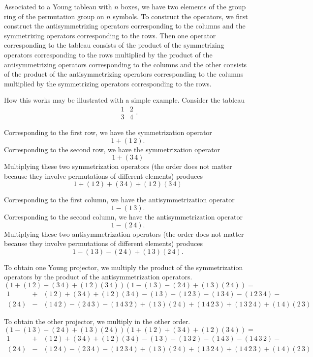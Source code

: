 \documentclass[12pt]{article}
\begin{document}
Associated to a Young tableau with $n$ boxes, we have two elements 
of the group ring of the permutation group on $n$ symbols.  To
construct the operators, we first construct the antisymmetrizing
operators corresponding to the columns and the symmetrizing
operators corresponding to the rows.  Then one operator corresponding
to the tableau consists of the product of the symmetrizing operators
corresponding to the rows multiplied by the product of the 
antisymmetrizing operators corresponding to the columns and the
other consists of the product of the antisymmetrizing operators 
corresponding to the columns multiplied by the symmetrizing operators
corresponding to the rows.

How this works may be illustrated with a simple example.  Consider
the tableau
\[
\begin{matrix}
1 & 2\\
3 & 4
\end{matrix}.
\]

Corresponding to the first row, we have the symmetrization operator
\[
1 + (1\,2).
\]
Corresponding to the second row, we have the symmetrization operator
\[
1 + (3\,4)
\]
Multiplying these two symmetrization operators (the order does not
matter because they involve permutations of different elements)
produces
\[
1 + (1\,2) + (3\,4) + (1\,2) (3\,4)
\]

Corresponding to the first column, we have the antisymmetrization
operator
\[
1 - (1\,3).
\]
Corresponding to the second column, we have the antisymmetrization
operator
\[
1 - (2\,4).
\]
Multiplying these two antisymmetrization operators (the order does not
matter because they involve permutations of different elements)
produces
\[
1 - (1\,3) - (2\,4) + (1\,3) (2\,4).
\]

To obtain one Young projector, we multiply the product of
the symmetrization operators by the product of the 
antisymmetrization 
operators.
\[
\left( 1 + (1\,2) + (3\,4) + (1\,2) (3\,4) \right)
\left( 1 - (1\,3) - (2\,4) + (1\,3) (2\,4) \right) =
\]
\begin{eqnarray*}
1 &+& (1\,2) + (3\,4) + (1\,2) (3\,4) -
(1\,3) - (1\,2\,3) - (1\,3\,4) - (1\,2\,3\,4) - \\
(2\,4) &-& (1\,4\,2) - (2\,4\,3) - (1\,4\,3\,2) +
(1\,3) (2\,4) + (1\,4\,2\,3) + (1\,3\,2\,4) + (1\,4) (2\,3)
\end{eqnarray*}

To obtain the other projector, we multiply in the other order.
\[
\left( 1 - (1\,3) - (2\,4) + (1\,3) (2\,4) \right)
\left( 1 + (1\,2) + (3\,4) + (1\,2) (3\,4) \right) =
\]
\begin{eqnarray*}
1 &+& (1\,2) + (3\,4) + (1\,2) (3\,4) -
(1\,3) - (1\,3\,2) - (1\,4\,3) - (1\,4\,3\,2) - \\
(2\,4) &-& (1\,2\,4) - (2\,3\,4) - (1\,2\,3\,4) +
(1\,3) (2\,4) + (1\,3\,2\,4) + (1\,4\,2\,3) +
(1\,4)(2\,3)
\end{eqnarray*}
\end{document}
